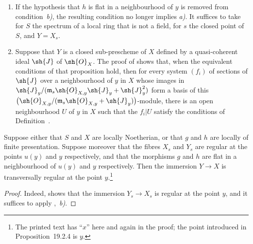 \begin{remarks}[19.2.5]
\label{IV.19.2.5}
\medskip\noindent
\begin{enumerate}[label=(\roman*)]
  \item If the hypothesis that $h$ is flat in a neighbourhood of $y$ is removed from condition~\emph{b)}, the resulting condition no longer implies \emph{a)}.
It suffices to take for $S$ the spectrum of a local ring that is not a field, for $s$ the closed point of $S$, and $Y=X_s$.
  \item Suppose that $Y$ is a closed sub-prescheme of $X$ defined by a quasi-coherent ideal $\sh{J}$ of $\sh{O}_X$.
The proof of  shows that, when the equivalent conditions of that proposition hold, then for every system $(f_i)$ of sections of $\sh{J}$ over a neighbourhood of $y$ in $X$ whose images in $\sh{J}_y/(\mathfrak{m}_s\sh{O}_{X,y}\sh{J}_y+\sh{J}_y^2)$ form a basis of this $\bigl(\sh{O}_{X,y}/(\mathfrak{m}_s\sh{O}_{X,y}+\sh{J}_y)\bigr)$-module, there is an open neighbourhood $U$ of $y$ in $X$ such that the $f_i|U$ satisfy the conditions of Definition~.
\end{enumerate}
\end{remarks}

\begin{corollary}[19.2.6]
\label{IV.19.2.6}
Suppose either that $S$ and $X$ are locally Noetherian, or that $g$ and $h$ are locally of finite presentation.
Suppose moreover that the fibres $X_s$ and $Y_s$ are regular at the points $u(y)$ and $y$ respectively, and that the morphisms $g$ and $h$ are flat in a neighbourhood of $u(y)$ and $y$ respectively.
Then the immersion $Y\to X$ is transversally regular at the point $y$.\footnote{The printed text has ``$x$'' here and again in the proof; the point introduced in Proposition~19.2.4 is $y$.}
\end{corollary}

\begin{proof}
Indeed,  shows that the immersion $Y_s\to X_s$ is regular at the point $y$, and it suffices to apply ,~\emph{b)}.
\end{proof}

